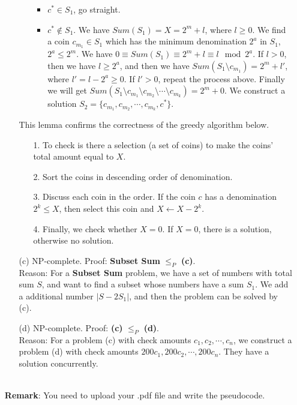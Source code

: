 \documentclass{article}
\begin{document}
\begin{enumerate}
\begin{itemize}
\begin{itemize}
\begin{itemize}
                \item $c^*\in S_1$, go straight.
                \item $c^*\notin S_1$. We have $Sum(S_1)=X=2^m+l$, where $l\geq 0$. We find a coin $c_{m_1}\in S_1$ which has the minimum denomination $2^a$ in $S_1$, $2^a\leq 2^m$. We have $0\equiv Sum(S_1)\equiv 2^m+l\equiv l\mod{2^a}$. If $l>0$, then we have $l\geq 2^a$, and then we have $Sum(S_1\setminus c_{m_1})=2^m+l'$, where $l'=l-2^a\geq 0$. If $l'>0$, repeat the process above. Finally we will get $Sum(S_1\setminus c_{m_1}\setminus c_{m_2}\setminus\cdots\setminus c_{m_k}) = 2^m+0$. We construct a solution $S_2=\{c_{m_1},c_{m_2},\cdots,c_{m_k}, c^*\}$.
            \end{itemize}
        \end{itemize}
        This lemma confirms the correctness of the greedy algorithm below. \begin{itemize}
            \item [1.] To check is there a selection (a set of coins) to make the coins' total amount equal to $X$.
            \item [2.] Sort the coins in descending order of denomination.
            \item [3.] Discuss each coin in the order. If the coin $c$ has a denomination $2^k \leq X$, then select this coin and $X\leftarrow X-2^k$.
            \item [4.] Finally, we check whether $X=0$. If $X=0$, there is a solution, otherwise no solution.
        \end{itemize}
    \item [(c)] NP-complete. Proof: \textbf{Subset Sum} $\leq_P$ \textbf{(c)}.\\Reason: For a \textbf{Subset Sum} problem, we have a set of numbers with total sum $S$, and want to find a subset whose numbers have a sum $S_1$. We add a additional number $|S-2S_1|$, and then the problem can be solved by (c).
    \item [(d)] NP-complete. Proof: \textbf{(c)} $\leq_P$ \textbf{(d)}. \\Reason: For a problem (c) with check amounts $c_1,c_2,\cdots,c_n$, we construct a problem (d) with check amounts $200c_1,200c_2,\cdots,200c_n$. They have a solution concurrently.
\end{itemize}
~\\


\textbf{Remark}: You need to upload your .pdf file and write the pseudocode.
\end{enumerate}
\end{document}
